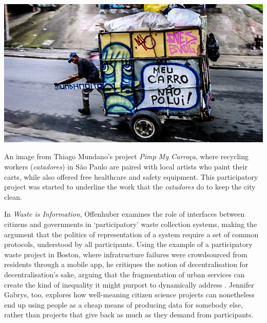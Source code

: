 \documentclass[nofonts,nols,justified,nobib]{tufte-book}
\begin{document}
\begin{marginfigure}
\includegraphics[width=\textwidth]{img/1/catadores.jpg}
\caption{An image from Thiago Mundano's project \emph{Pimp My Carro\c{c}a}, where recycling workers (\emph{catadores}) in S\~{a}o Paulo are paired with local artists who paint their carts, while also offered free healthcare and safety equipment. This participatory project was started to underline the work that the \emph{catadores} do to keep the city clean. \cite{mundano_pimp_nodate}}
\end{marginfigure}

In \emph{Waste is Information}, Offenhuber examines the role of interfaces between citizens and governments in `participatory' waste collection systems, making the argument that the politics of representation of a system require a set of common protocols, understood by all participants. Using the example of a participatory waste project in Boston, where infratructure failures were crowdsourced from residents through a mobile app, he critiques the notion of decentralisation for decentralisation's sake, arguing that the fragmentation of urban services can create the kind of inequality it might purport to dynamically address \cite{offenhuber_waste_2017}. Jennifer Gabrys, too, explores how well-meaning citizen science projects can nonetheless end up using people as a cheap means of producing data for somebody else, rather than projects that give back as much as they demand from participants. \cite{Gabrys_programming_2014}
\end{document}

